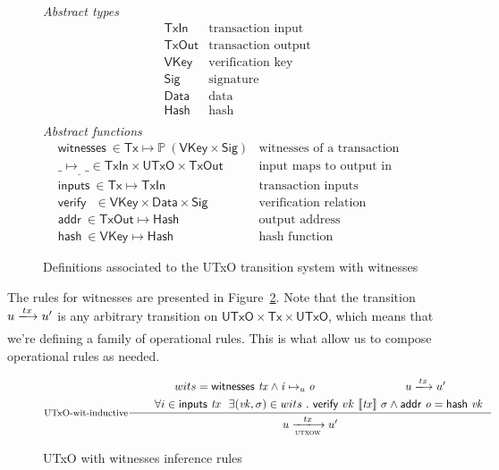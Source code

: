 \documentclass[11pt,a4paper]{article}
\newcommand{\powerset}[1]{\mathbb{P}~#1}
\newcommand{\var}[1]{\mathit{#1}}
\newcommand{\fun}[1]{\mathsf{#1}}
\newcommand{\type}[1]{\mathsf{#1}}
\newcommand{\trans}[2]{\xlongrightarrow[\textsc{#1}]{#2}}
\newcommand{\Tx}{\type{Tx}}
\newcommand{\UTxO}{\type{UTxO}}
\newcommand{\TxIn}{\type{TxIn}}
\newcommand{\TxOut}{\type{TxOut}}
\newcommand{\VKey}{\type{VKey}}
\newcommand{\Sig}{\type{Sig}}
\newcommand{\Data}{\type{Data}}
\newcommand{\Hash}{\type{Hash}}
\newcommand{\inputs}[1]{\fun{inputs}\ \var{#1}}
\newcommand{\witnesses}[1]{\fun{witnesses}\ \var{#1}}
\newcommand{\verify}[3]{\fun{verify} ~ #1 ~ #2 ~ #3}
\newcommand{\serialised}[1]{\llbracket \var{#1} \rrbracket}
\newcommand{\addr}[1]{\fun{addr}\ \var{#1}}
\newcommand{\hash}[1]{\fun{hash}\ \var{#1}}
\newcommand{\inout}[3]{\var{#1}\mapsto_{#2}\var{#3}}
\begin{document}
\begin{figure}[h]
  \emph{Abstract types}
  \begin{align*}
    & \TxIn & \text{transaction input}\\
    & \TxOut & \text{transaction output}\\
    & \VKey & \text{verification key}\\
    & \Sig  & \text{signature}\\
    & \Data  & \text{data}\\
    & \Hash  & \text{hash}\\
  \end{align*}
  \emph{Abstract functions}
  \begin{align*}
    & \witnesses{} \in \Tx \mapsto \powerset{(\VKey \times \Sig)}
    & \text{witnesses of a transaction}\\
    & \inout{\_}{\_}{\_} \in \TxIn \times \UTxO \times \TxOut
    & \text{input maps to output in utxo}\\
    & \inputs{} \in \Tx \mapsto \TxIn
    & \text{transaction inputs}\\
    & \verify{}{}{} \in \VKey \times \Data \times \Sig
    & \text{verification relation}\\
    & \addr{} \in \TxOut \mapsto \Hash
    & \text{output address} \\
    & \hash{} \in \VKey \mapsto \Hash
    & \text{hash function}
  \end{align*}
  \caption{Definitions associated to the UTxO transition system with witnesses}
  \label{fig:state-trans-utxo-witnesses-defs}
\end{figure}

The rules for witnesses are presented in Figure~\ref{fig:rules-utxo-witnesses}.
Note that the transition $u \trans{}{tx} u'$ is any arbitrary transition on
$\UTxO \times \Tx \times \UTxO$, which means that we're defining a family of
operational rules. This is what allow us to compose operational rules as
needed.

\begin{figure}[h]
  \begin{equation}
    \label{eq:utxo-witness-inductive}
    \inference[UTxO-wit-inductive]
    {wits = \witnesses{tx} \wedge \inout{i}{u}{o}
      & u \trans{}{tx} u'\\
      & \forall i \in \inputs{tx} ~ ~ \exists (\var{vk}, \sigma) \in wits ~ . ~
      \verify{vk}{\serialised{tx}}{\sigma}  \wedge \addr{o} = \hash{vk}
    }
    {u \trans{utxow}{tx} u'}
  \end{equation}
  \caption{UTxO with witnesses inference rules}
  \label{fig:rules-utxo-witnesses}
\end{figure}
\end{document}
